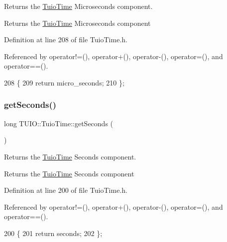Returns the \hyperlink{class_t_u_i_o_1_1_tuio_time}{Tuio\+Time} Microseconds component. \begin{DoxyReturn}{Returns}
the \hyperlink{class_t_u_i_o_1_1_tuio_time}{Tuio\+Time} Microseconds component 
\end{DoxyReturn}


Definition at line 208 of file Tuio\+Time.\+h.



Referenced by operator!=(), operator+(), operator-\/(), operator=(), and operator==().


\begin{DoxyCode}
208                                \{
209             \textcolor{keywordflow}{return} micro\_seconds;
210         \};
\end{DoxyCode}
\mbox{\label{class_t_u_i_o_1_1_tuio_time_a7d50635899893b7fbbb05d8356576ccb}} 
\subsubsection{\texorpdfstring{get\+Seconds()}{getSeconds()}}
{\footnotesize\ttfamily long T\+U\+I\+O\+::\+Tuio\+Time\+::get\+Seconds (\begin{DoxyParamCaption}{ }\end{DoxyParamCaption})\hspace{0.3cm}{\ttfamily [inline]}}

Returns the \hyperlink{class_t_u_i_o_1_1_tuio_time}{Tuio\+Time} Seconds component. \begin{DoxyReturn}{Returns}
the \hyperlink{class_t_u_i_o_1_1_tuio_time}{Tuio\+Time} Seconds component 
\end{DoxyReturn}


Definition at line 200 of file Tuio\+Time.\+h.



Referenced by operator!=(), operator+(), operator-\/(), operator=(), and operator==().


\begin{DoxyCode}
200                           \{
201             \textcolor{keywordflow}{return} seconds;
202         \};
\end{DoxyCode}
\mbox{\label{class_t_u_i_o_1_1_tuio_time_a04e3e660b895b349a26b0364401878b9}} 
